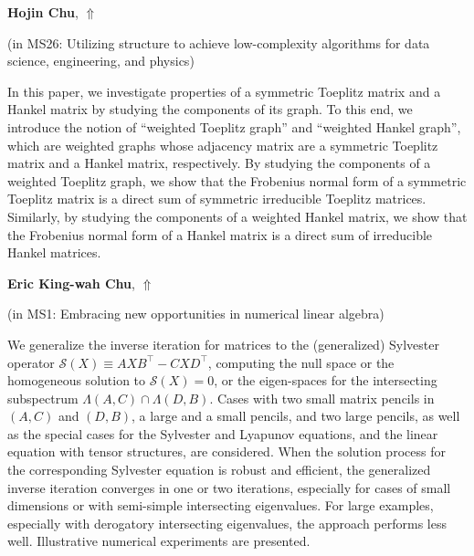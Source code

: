 \documentclass[ILAS2025-program.tex]{subfiles}
\begin{document}
\hypertarget{down0136}{}\begin{ilasabstract}
    
\textbf{Hojin Chu},  \hfill \hyperlink{up0136}{$\Uparrow$}
    
    
(in {\color{mstitle}MS26: Utilizing structure to achieve low-complexity algorithms for data science, engineering, and physics})
        
\mtskip
    In this paper, we investigate properties of a symmetric Toeplitz matrix and a Hankel matrix by studying the components of its graph.
To this end, we introduce the notion of ``weighted Toeplitz graph'' and ``weighted Hankel graph'', which are weighted graphs whose adjacency matrix are a symmetric Toeplitz matrix and a Hankel matrix, respectively.
By studying the components of a weighted Toeplitz graph, we show that the Frobenius normal form of a symmetric Toeplitz matrix is a direct sum of symmetric irreducible Toeplitz matrices.
Similarly, by studying the components of a weighted Hankel matrix, we show that the Frobenius normal form of a Hankel matrix is a direct sum of irreducible Hankel matrices.
\end{ilasabstract}
    

\hypertarget{down0304}{}\begin{ilasabstract}
    
\textbf{Eric King-wah Chu},  \hfill \hyperlink{up0304}{$\Uparrow$}
    
    
(in {\color{mstitle}MS1: Embracing new opportunities in numerical linear algebra})
        
\mtskip
    We generalize the inverse iteration for matrices  to the (generalized) Sylvester operator $\mathcal{S}(X) \equiv AXB^\top - CXD^\top$, computing the null space or the homogeneous solution to $\mathcal{S}(X)=0$, or the eigen-spaces for the intersecting subspectrum $\Lambda (A, C) \cap \Lambda (D,B)$. Cases with two small matrix pencils in $(A,C)$ and $(D,B)$, a large and a small pencils, and two large pencils, as well as the special cases for the Sylvester and Lyapunov equations, and the linear equation with tensor structures, are  considered. When the solution process for the corresponding Sylvester equation is robust and efficient, the generalized inverse iteration converges in one or two iterations, especially for cases of small dimensions or with semi-simple intersecting eigenvalues. For large examples, especially with derogatory intersecting eigenvalues, the approach performs less well. Illustrative numerical experiments are presented.

\end{ilasabstract}
    
\end{document}
